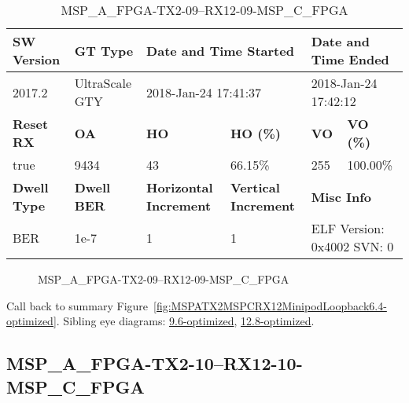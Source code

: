 \begin{table}[h]
\centering
\caption{MSP\_A\_FPGA-TX2-09--RX12-09-MSP\_C\_FPGA}
\label{tab:MSPAFPGATX209RX1209MSPCFPGA6.4-optimized}
\begin{tabular}{@{}|l|l|l|l|l|l|@{}}
\toprule
\textbf{SW Version}                & \textbf{GT Type}   & \multicolumn{2}{l|}{\textbf{Date and Time Started}}            & \multicolumn{2}{l|}{\textbf{Date and Time Ended}}        \\ \midrule
2017.2                       & UltraScale GTY          & \multicolumn{2}{l|}{2018-Jan-24 17:41:37}                   & \multicolumn{2}{l|}{2018-Jan-24 17:42:12}               \\ \midrule
\textbf{Reset RX}                  & \textbf{OA} & \textbf{HO}   & \textbf{HO (\%)} & \textbf{VO} & \textbf{VO (\%)} \\ \midrule
true & 9434        & 43          & 66.15\%        & 255        & 100.00\%       \\ \midrule
\textbf{Dwell Type}                & \textbf{Dwell BER} & \textbf{Horizontal Increment} & \textbf{Vertical Increment}    & \multicolumn{2}{l|}{\textbf{Misc Info}}                  \\ \midrule
BER                            & 1e-7        & 1        & 1           & \multicolumn{2}{l|}{ELF Version: 0x4002 SVN: 0}                         \\ \bottomrule
\end{tabular}
\end{table}

\begin{figure}[h]
\caption{MSP\_A\_FPGA-TX2-09--RX12-09-MSP\_C\_FPGA} \label{fig:MSPAFPGATX209RX1209MSPCFPGA6.4-optimized}
\end{figure}

Call back to summary Figure~\ref{fig:MSPATX2MSPCRX12MinipodLoopback6.4-optimized}.
Sibling eye diagrams: \hyperref[sec:MSPAFPGATX209RX1209MSPCFPGA9.6-optimized]{9.6-optimized}, \hyperref[sec:MSPAFPGATX209RX1209MSPCFPGA12.8-optimized]{12.8-optimized}.

\clearpage
\newpage


\subsection{MSP\_A\_FPGA-TX2-10--RX12-10-MSP\_C\_FPGA}\label{sec:MSPAFPGATX210RX1210MSPCFPGA6.4-optimized}


